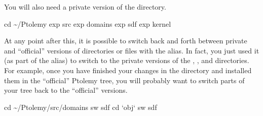 You will also need a private version of the  directory.
\begin{example}
cd \sim{}/Ptolemy
exp src
exp domains
exp sdf
exp kernel
\end{example}

At any point after this, it is possible to switch back and forth
between private and ``official'' versions of directories or files with
the  alias.  In fact, you just used it (as part of the
 alias) to switch to the private versions of the
, , and  directories.
For example, once you have finished your changes in the
 directory and installed them in the ``official''
Ptolemy tree, you will probably want to switch parts of your tree back
to the ``official'' versions.
\begin{example}
cd \sim{}/Ptolemy/src/domains
sw sdf
cd `obj`
sw sdf
\end{example}

\begin{ifhtml}

\end{ifhtml}
